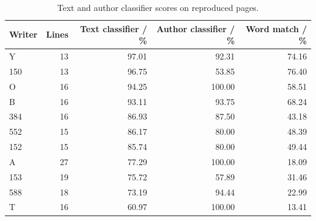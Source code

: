\begin{table}[H]\centering\small
\begin{tabular}{lrrrr}\toprule
\textbf{Writer} & \textbf{Lines} & \textbf{Text classifier / \%} & \textbf{Author classifier / \%} & \textbf{Word match / \%}\\\midrule
Y & 13 & 97.01 & 92.31 & 74.16\\
150 & 13 & 96.75 & 53.85 & 76.40\\
O & 16 & 94.25 & 100.00 & 58.51\\
B & 16 & 93.11 & 93.75 & 68.24\\
384 & 16 & 86.93 & 87.50 & 43.18\\
552 & 15 & 86.17 & 80.00 & 48.39\\
152 & 15 & 85.74 & 80.00 & 49.44\\
A & 27 & 77.29 & 100.00 & 18.09\\
153 & 19 & 75.72 & 57.89 & 31.46\\
588 & 18 & 73.19 & 94.44 & 22.99\\
T & 16 & 60.97 & 100.00 & 13.41\\
\bottomrule\end{tabular}
\caption{Text and author classifier scores on reproduced pages.}\label{tab:app-r1-writers}
\end{table}

